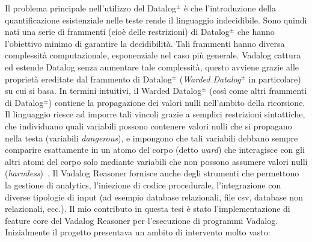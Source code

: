 Il problema principale nell'utilizzo del Datalog$^\pm$ è che l'introduzione della quantificazione esistenziale nelle teste rende il linguaggio indecidibile. Sono quindi nati una serie di frammenti (cioè delle restrizioni) di Datalog$^\pm$ che hanno l'obiettivo minimo di garantire la decidibilità. Tali frammenti hanno diversa complessità computazionale, esponenziale nel caso più generale. \newline
Vadalog cattura ed estende Datalog senza aumentare tale complessità, questo avviene grazie alle proprietà ereditate dal frammento di Datalog$^\pm$ (\emph{Warded Datalog$^\pm$} in particolare) su cui si basa. In termini intuitivi, il Warded Datalog$^\pm$ (così come altri frammenti di Datalog$^\pm$) contiene la propagazione dei valori nulli nell'ambito della ricorsione. Il linguaggio riesce ad imporre tali vincoli grazie a semplici restrizioni sintattiche, che individuano quali variabili possono contenere valori nulli che si propagano nella testa (variabili \emph{dangerous}), e impongono che tali variabili debbano sempre comparire esattamente in un atomo del corpo (detto \emph{ward}) che interagisce con gli altri atomi del corpo solo mediante variabili che non possono assumere valori nulli (\emph{harmless})~\cite{bellomarini2017swift}. \newline
Il Vadalog Reasoner fornisce anche degli strumenti che permettono la gestione di analytics, l'iniezione di codice procedurale, l'integrazione con diverse tipologie di input (ad esempio database relazionali, file csv, database non relazionali, ecc.).\newline \newline
Il mio contributo in questa tesi è stato l'implementazione di feature core del Vadalog Reasoner per l'esecuzione di programmi Vadalog. Inizialmente il progetto presentava un ambito di intervento molto vasto: 
